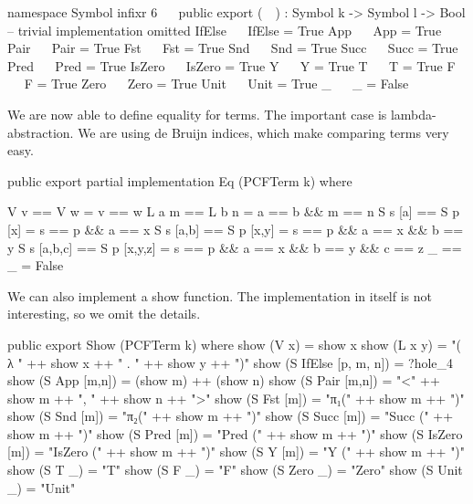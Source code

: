 \begin{code}
namespace Symbol
  infixr 6 ~~
  public export
  (~~) : Symbol k -> Symbol l -> Bool
  -- trivial implementation omitted
  IfElse ~~ IfElse = True
  App    ~~ App    = True
  Pair   ~~ Pair   = True
  Fst    ~~ Fst    = True
  Snd    ~~ Snd    = True
  Succ   ~~ Succ   = True
  Pred   ~~ Pred   = True
  IsZero ~~ IsZero = True
  Y      ~~ Y      = True
  T      ~~ T      = True
  F      ~~ F      = True
  Zero   ~~ Zero   = True
  Unit   ~~ Unit   = True
  _      ~~ _      = False
\end{code}

We are now able to define equality for terms. The important case is
lambda-abstraction. We are using de Bruijn indices, which make comparing terms
very easy.

\begin{code}
public export partial
implementation Eq (PCFTerm k) where

  V v         == V w          = v == w
  L a m       == L b n        = a == b && m == n
  S s [a]     == S p [x]      = s == p && a == x
  S s [a,b]   == S p [x,y]    = s == p && a == x && b == y
  S s [a,b,c] == S p [x,y,z]  = s == p && a == x && b == y && c == z
  _           == _            = False
\end{code}

We can also implement a show function. The implementation in itself is not
interesting, so we omit the details.

\begin{hidden}
public export
Show (PCFTerm k) where
  show (V x)   = show x
  show (L x y) = "( λ " ++ show x ++ " . " ++ show y ++ ")"
  show (S IfElse [p, m, n]) = ?hole_4
  show (S App    [m,n]) = (show m) ++ (show n)
  show (S Pair   [m,n]) = "<" ++ show m ++ ", " ++ show n ++ ">"
  show (S Fst    [m])   = "π₁(" ++ show m ++ ")"
  show (S Snd    [m])   = "π₂(" ++ show m ++ ")"
  show (S Succ   [m])   = "Succ (" ++ show m ++ ")"
  show (S Pred   [m])   = "Pred (" ++ show m ++ ")"
  show (S IsZero [m])   = "IsZero (" ++ show m ++ ")"
  show (S Y      [m])   = "Y (" ++ show m ++ ")"
  show (S T      _)     = "T"
  show (S F      _)     = "F"
  show (S Zero   _)     = "Zero"
  show (S Unit   _)     = "Unit"
\end{hidden}
